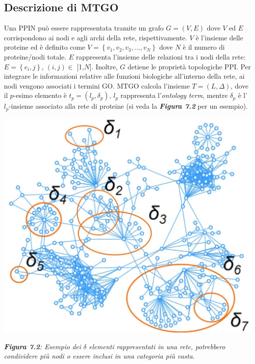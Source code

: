 \documentclass[11pt]{article}
\begin{document}
\subsection{Descrizione di MTGO}
Una PPIN può essere rappresentata tramite un grafo $G = (V,E)$ dove $V$ ed $E$ corrispondono ai nodi e agli archi della rete, rispettivamente. $V$ è l'insieme delle proteine ed è definito come $V =\left \{v_1, v_2, v_3, ..., v_N\right \}$ dove $N$ è il numero di proteine/nodi totale. $E$ rappresenta l'insieme delle relazioni tra i nodi della rete: $E = \left \{e_i,j\right \}$, $(i,j) \in$ [1,$N$]. Inoltre, $G$ detiene le proprietà topologiche PPI. Per integrare le informazioni relative alle funzioni biologiche all'interno della rete, ai nodi vengono associati i termini GO. MTGO calcola l'insieme $T = (L, \Delta)$, dove il $p$-esimo elemento è $t_p = (l_p, \delta_p)$, $l_p$ rappresenta l'\textit{ontology term}, mentre $\delta_p$ è l'$l_p$-insieme associato alla rete di proteine (si veda la \textit{\textbf{Figura 7.2}} per un esempio).

\begin{center}
\includegraphics[scale=0.4]{delta}

\begin{small}\textit{\textbf{Figura 7.2}: Esempio dei $\delta$ elementi rappresentati in una rete, potrebbero condividere più nodi o essere inclusi in una categoria più vasta}.\end{small}
\end{center}
\end{document}
